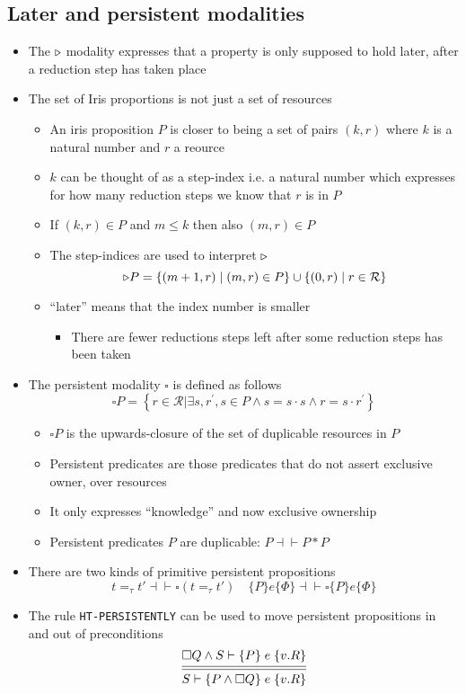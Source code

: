 \subsection{Later and persistent modalities}
\begin{itemize}
  \item The $\triangleright$ modality expresses that a property is only supposed to hold later, after a reduction step has taken place
	\item The set of Iris proportions is not just a set of resources
  \begin{itemize}
  	\item An iris proposition $P$ is closer to being a set of pairs $(k,r)$ where $k$ is a natural number and $r$ a reource
    \item $k$ can be thought of as a step-index i.e. a natural number which expresses for how many reduction steps we know that $r$ is in $P$ 
    \item If $(k,r) \in P$ and $m \leq k$ then also $(m,r) \in P$ 
    \item The step-indices are used to interpret $\triangleright$
    \[
      \triangleright P=\{(m+1, r) \mid (m, r) \in P\} \cup\{(0, r) \mid r \in \mathcal{R}\}
    \]
    \item ``later'' means that the index number is smaller 
    \begin{itemize}
    	\item There are fewer reductions steps left after some reduction steps has been taken
    \end{itemize}
  \end{itemize}
  \item The persistent modality $\square$ is defined as follows
  \[
    \square P=\left\{r \in \mathcal{R} | \exists s, r^{\prime}, s \in P \wedge s=s \cdot s \wedge r=s \cdot r^{\prime}\right\}
  \]
  \begin{itemize}
  	\item $\square P$ is the upwards-closure of the set of duplicable resources in $P$
    \item Persistent predicates are those predicates that do not assert exclusive owner, over resources
    \item It only expresses ``knowledge'' and now exclusive ownership
    \item Persistent predicates $P$ are duplicable: $P \dashv\vdash P * P$
  \end{itemize}
  \item There are two kinds of primitive persistent propositions 
  \[
    t =_\tau t' \dashv \vdash \square (t =_\tau t') \quad \{P\} e \{\Phi\} \dashv \vdash \square \{P\} e \{\Phi\}
  \]
  \item The rule \texttt{HT-PERSISTENTLY} can be used to move persistent propositions in and out of preconditions
  \[
  \begin{prooftree} 
    \hypo{\square Q \land S \vdash \{P\}\; e \; \{v.R\}}
    \infer[double]1{S \vdash \{P \land \square Q\}\; e \; \{v.R\}} 
  \end{prooftree}
  \]
\end{itemize}

